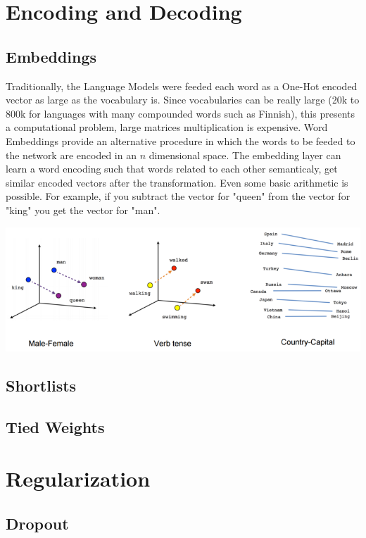 \documentclass[a4paper]{article}
\begin{document}
\section{Encoding and Decoding}
\label{sec:encdec}

\subsection{Embeddings}
\label{sec:embedddings}
Traditionally, the Language Models were feeded each word as a One-Hot encoded vector as large as the vocabulary is. Since vocabularies can be really large (20k to 800k for languages with many compounded words such as Finnish), this presents a computational problem, large matrices multiplication is expensive.
Word Embeddings provide an alternative procedure in which the words to be feeded to the network are encoded in an $n$ dimensional space. The embedding layer can learn a word encoding such that words related to each other semanticaly, get similar encoded vectors after the transformation.
Even some basic arithmetic is possible. For example, if you subtract the vector for "queen" from the vector for "king" you get the vector for "man".

\includegraphics[width=\textwidth]{01}


\subsection{Shortlists}
\label{sec:shortlists}

\subsection{Tied Weights}
\label{sec:tiedweights}

\section{Regularization}
\label{sec:regularization}

\subsection{Dropout}
\label{sec:dropout}
\end{document}

